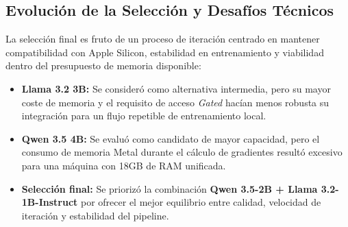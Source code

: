 \subsection{Evolución de la Selección y Desafíos Técnicos}
La selección final es fruto de un proceso de iteración centrado en mantener compatibilidad con Apple Silicon, estabilidad en entrenamiento y viabilidad dentro del presupuesto de memoria disponible:
\begin{itemize}
    \item \textbf{Llama 3.2 3B:} Se consideró como alternativa intermedia, pero su mayor coste de memoria y el requisito de acceso \textit{Gated} hacían menos robusta su integración para un flujo repetible de entrenamiento local.
    \item \textbf{Qwen 3.5 4B:} Se evaluó como candidato de mayor capacidad, pero el consumo de memoria Metal durante el cálculo de gradientes resultó excesivo para una máquina con 18GB de RAM unificada.
    \item \textbf{Selección final:} Se priorizó la combinación \textbf{Qwen 3.5-2B + Llama 3.2-1B-Instruct} por ofrecer el mejor equilibrio entre calidad, velocidad de iteración y estabilidad del pipeline.
\end{itemize}

